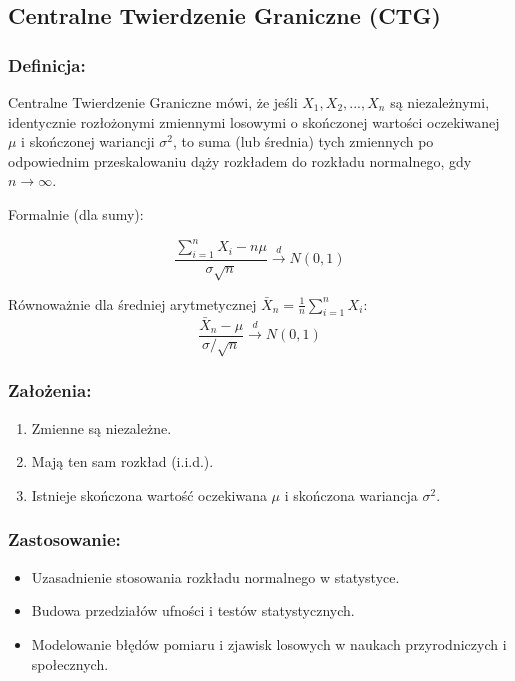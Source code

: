 \subsection{Centralne Twierdzenie Graniczne (CTG)}

\subsubsection*{Definicja:}
Centralne Twierdzenie Graniczne mówi, że jeśli $X_1, X_2, ..., X_n$ są niezależnymi, identycznie rozłożonymi zmiennymi losowymi o skończonej wartości oczekiwanej $\mu$ i skończonej wariancji $\sigma^2$, to suma (lub średnia) tych zmiennych po odpowiednim przeskalowaniu dąży rozkładem do rozkładu normalnego, gdy $n \to \infty$.

Formalnie (dla sumy):

$$
\frac{\sum_{i=1}^n X_i - n\mu}{\sigma \sqrt{n}} \xrightarrow{d} N(0,1)
$$

Równoważnie dla średniej arytmetycznej $\bar{X}_n = \frac{1}{n}\sum_{i=1}^n X_i$:
$$
\frac{\bar{X}_n - \mu}{\sigma / \sqrt{n}} \xrightarrow{d} N(0,1)
$$

\subsubsection*{Założenia:}
\begin{enumerate}
    \item Zmienne są niezależne.
    \item Mają ten sam rozkład (i.i.d.).
    \item Istnieje skończona wartość oczekiwana $\mu$ i skończona wariancja $\sigma^2$.
\end{enumerate}

\subsubsection*{Zastosowanie:}
\begin{itemize}
    \item Uzasadnienie stosowania rozkładu normalnego w statystyce.
    \item Budowa przedziałów ufności i testów statystycznych.
    \item Modelowanie błędów pomiaru i zjawisk losowych w naukach przyrodniczych i społecznych.
\end{itemize}

